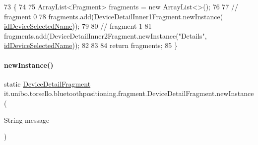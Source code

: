 \begin{DoxyCode}
73                                                \{
74 
75         ArrayList<Fragment> fragments = \textcolor{keyword}{new} ArrayList<>();
76 
77         \textcolor{comment}{// fragment 0}
78         fragments.add(DeviceDetailInner1Fragment.newInstance(
      \hyperlink{classit_1_1unibo_1_1torsello_1_1bluetoothpositioning_1_1fragment_1_1DeviceDetailFragment_a6d52d8371a07fb8da75879758d1d6942_a6d52d8371a07fb8da75879758d1d6942}{idDeviceSelectedName}));
79 
80         \textcolor{comment}{// fragment 1}
81         fragments.add(DeviceDetailInner2Fragment.newInstance(\textcolor{stringliteral}{"Details"}, 
      \hyperlink{classit_1_1unibo_1_1torsello_1_1bluetoothpositioning_1_1fragment_1_1DeviceDetailFragment_a6d52d8371a07fb8da75879758d1d6942_a6d52d8371a07fb8da75879758d1d6942}{idDeviceSelectedName}));
82 
83 
84         \textcolor{keywordflow}{return} fragments;
85     \}
\end{DoxyCode}
\hypertarget{classit_1_1unibo_1_1torsello_1_1bluetoothpositioning_1_1fragment_1_1DeviceDetailFragment_a626de18d36d44ae0b4ff21c2527bdf5a_a626de18d36d44ae0b4ff21c2527bdf5a}{}\label{classit_1_1unibo_1_1torsello_1_1bluetoothpositioning_1_1fragment_1_1DeviceDetailFragment_a626de18d36d44ae0b4ff21c2527bdf5a_a626de18d36d44ae0b4ff21c2527bdf5a} 
\paragraph{\texorpdfstring{new\+Instance()}{newInstance()}}
{\footnotesize\ttfamily static \hyperlink{classit_1_1unibo_1_1torsello_1_1bluetoothpositioning_1_1fragment_1_1DeviceDetailFragment}{Device\+Detail\+Fragment} it.\+unibo.\+torsello.\+bluetoothpositioning.\+fragment.\+Device\+Detail\+Fragment.\+new\+Instance (\begin{DoxyParamCaption}\item[{String}]{message }\end{DoxyParamCaption})\hspace{0.3cm}{\ttfamily [static]}}


